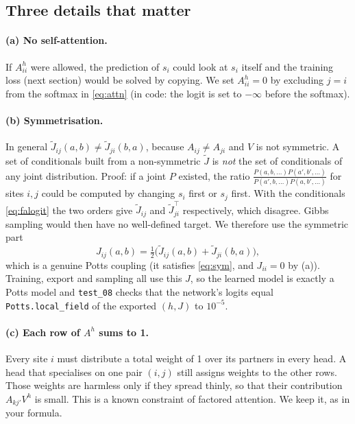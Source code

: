 \subsection{Three details that matter}
\paragraph{(a) No self-attention.} If $A^h_{ii}$ were allowed, the prediction of $s_i$ could look at $s_i$
itself and the training loss (next section) would be solved by copying. We set $A^h_{ii}=0$ by excluding
$j=i$ from the softmax in \eqref{eq:attn} (in code: the logit is set to $-\infty$ before the softmax).

\paragraph{(b) Symmetrisation.} In general $\tilde J_{ij}(a,b)\neq\tilde J_{ji}(b,a)$, because $A_{ij}\ne A_{ji}$
and $V$ is not symmetric. A set of conditionals built from a non-symmetric $\tilde J$ is \emph{not} the
set of conditionals of any joint distribution. Proof: if a joint $P$ existed, the ratio
$\frac{P(a,b,\dots)P(a',b',\dots)}{P(a',b,\dots)P(a,b',\dots)}$ for sites $i,j$ could be computed by changing
$s_i$ first or $s_j$ first. With the conditionals \eqref{eq:falogit} the two orders give
$\tilde J_{ij}$ and $\tilde J_{ji}^\top$ respectively, which disagree. Gibbs sampling would then have no
well-defined target. We therefore use the symmetric part
\begin{equation}\label{eq:sym2}
J_{ij}(a,b)=\tfrac12\big(\tilde J_{ij}(a,b)+\tilde J_{ji}(b,a)\big),
\end{equation}
which is a genuine Potts coupling (it satisfies \eqref{eq:sym}, and $J_{ii}=0$ by (a)). Training, export and
sampling all use this $J$, so the learned model is exactly a Potts model and \texttt{test\_08} checks that the
network's logits equal \texttt{Potts.local\_field} of the exported $(h,J)$ to $10^{-5}$.

\paragraph{(c) Each row of $A^h$ sums to 1.} Every site $i$ must distribute a total weight of 1 over its
partners in every head. A head that specialises on one pair $(i,j)$ still assigns weights to the other
rows. Those weights are harmless only if they spread thinly, so that their contribution
$A_{kj'}V^h$ is small. This is a known constraint of factored attention. We keep it, as in your formula.

